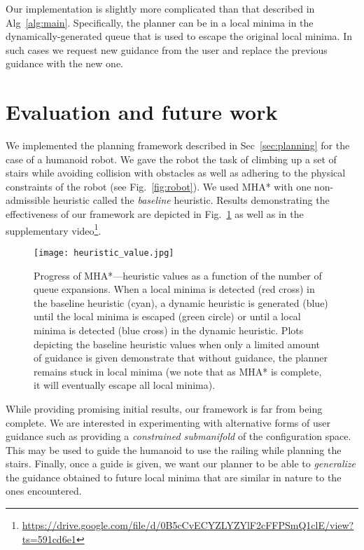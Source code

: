 \documentclass[conference]{IEEEtran}
\begin{document}
Our implementation is slightly more complicated than that described in Alg~\ref{alg:main}.
Specifically, the planner can be in a local minima in the dynamically-generated queue that is used to escape the original local minima. 
In such cases we request new guidance from the user and replace the previous guidance with the new one.

\section{Evaluation and future work}\label{sec:eval}
We implemented the planning framework described in Sec~\ref{sec:planning} for the case of a humanoid robot. We gave the robot the task of climbing up a set of stairs while avoiding collision with obstacles as well as adhering to the physical constraints of the robot (see Fig.~\ref{fig:robot}).
We used MHA* with one non-admissible heuristic called the \emph{baseline} heuristic.
Results demonstrating the effectiveness of our framework are depicted in Fig.~\ref{fig:res}
as well as in the supplementary video\footnote{
\url{https://drive.google.com/file/d/0B5cCvECYZLYZYlF2cFFPSmQ1clE/view?ts=591cd6e1}}. 


\begin{figure}[tb]
  \centering
  	\texttt{[image: heuristic\_value.jpg]}
  	\vspace{-2mm}
  \caption{
		Progress of MHA*---heuristic values as a function of the number of queue expansions.
		When a local minima is detected (red cross) in the baseline heuristic (cyan), a dynamic heuristic is generated (blue) until the local minima is escaped (green circle) or until a local minima is detected (blue cross) in the dynamic heuristic.
		Plots depicting the baseline heuristic values when only a limited amount of guidance is given demonstrate that without guidance, the planner remains stuck in local minima (we note that as MHA* is complete, it will eventually escape all local minima).
		}
\vspace{-5mm}
   	\label{fig:res}
\end{figure}

While providing promising initial results, our framework is far from being complete.
We are interested in experimenting with alternative forms of user guidance such as providing a \emph{constrained submanifold} of the configuration space. This may be used to guide the humanoid to use the railing while planning the stairs.
Finally, once a guide is given, we want our planner to be able to \emph{generalize} the guidance obtained to future local minima that are similar in nature to the ones encountered.


%


\end{document}
